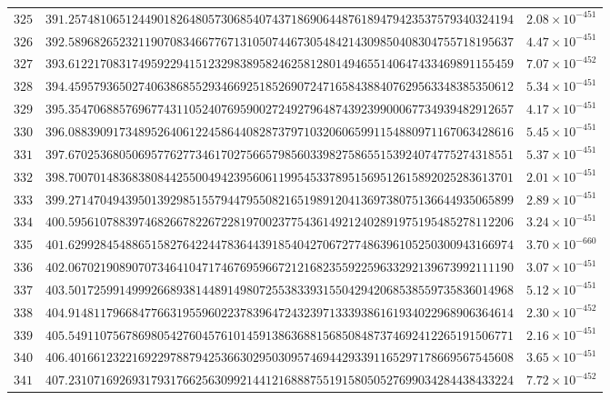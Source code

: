 \documentclass[12pt,reqno]{amsart}
\theoremstyle{remark}
\begin{document}
\begin{longtable}{clc}
$325$ & $391.2574810651244901826480573068540743718690644876189479423537579340324194$ & $2.08\times 10^{-451}$ \\
$326$ & $392.5896826523211907083466776713105074467305484214309850408304755718195637$ & $4.47\times 10^{-451}$ \\
$327$ & $393.6122170831749592294151232983895824625812801494655140647433469891155459$ & $7.07\times 10^{-452}$ \\
$328$ & $394.4595793650274063868552934669251852690724716584388407629563348385350612$ & $5.34\times 10^{-451}$ \\
$329$ & $395.3547068857696774311052407695900272492796487439239900067734939482912657$ & $4.17\times 10^{-451}$ \\
$330$ & $396.0883909173489526406122458644082873797103206065991154880971167063428616$ & $5.45\times 10^{-451}$ \\
$331$ & $397.6702536805069577627734617027566579856033982758655153924074775274318551$ & $5.37\times 10^{-451}$ \\
$332$ & $398.7007014836838084425500494239560611995453378951569512615892025283613701$ & $2.01\times 10^{-451}$ \\
$333$ & $399.2714704943950139298515579447955082165198912041369738075136644935065899$ & $2.89\times 10^{-451}$ \\
$334$ & $400.5956107883974682667822672281970023775436149212402891975195485278112206$ & $3.24\times 10^{-451}$ \\
$335$ & $401.6299284548865158276422447836443918540427067277486396105250300943166974$ & $3.70\times 10^{-660}$ \\
$336$ & $402.0670219089070734641047174676959667212168235592259633292139673992111190$ & $3.07\times 10^{-451}$ \\
$337$ & $403.5017259914999266893814489149807255383393155042942068538559735836014968$ & $5.12\times 10^{-451}$ \\
$338$ & $404.9148117966847766319559602237839647243239713339386161934022968906364614$ & $2.30\times 10^{-452}$ \\
$339$ & $405.5491107567869805427604576101459138636881568508487374692412265191506771$ & $2.16\times 10^{-451}$ \\
$340$ & $406.4016612322169229788794253663029503095746944293391165297178669567545608$ & $3.65\times 10^{-451}$ \\
$341$ & $407.2310716926931793176625630992144121688875519158050527699034284438433224$ & $7.72\times 10^{-452}$ \\

\end{longtable}
\end{document}
